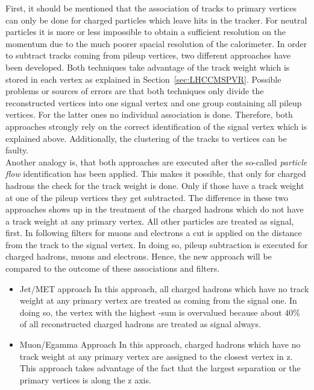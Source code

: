 First, it should be mentioned that the association of tracks to primary vertices can only be done for charged particles which leave hits in the tracker. For neutral particles it is more or less impossible to obtain a sufficient resolution on the momentum due to the much poorer spacial resolution of the calorimeter. In order to subtract tracks coming from pileup vertices, two different approaches have been developed. Both techniques take advantage of the track weight which is stored in each vertex as explained in Section~\ref{sec:LHCCMSPVR}. Possible problems or sources of errors are that both techniques only divide the reconstructed vertices into one signal vertex and one group containing all pileup vertices. For the latter ones no individual association is done. Therefore, both approaches strongly rely on the correct identification of the signal vertex which is explained above. Additionally, the clustering of the tracks to vertices can be faulty. \\
Another analogy is, that both approaches are executed after the so-called \textit{particle flow} identification has been applied. This makes it possible, that only for charged hadrons  the check for the track weight is done.  Only if those have a track weight at one of the pileup vertices they get subtracted. The difference in these two approaches shows up in the treatment of the charged hadrons which do not have a track weight at any primary vertex. All other particles are treated as signal, first. In following filters for muons and electrons a cut is applied on the distance from the track to the signal vertex. In doing so, pileup subtraction is executed for charged hadrons, muons and electrons. Hence, the new approach will be compared to the outcome of these associations and filters.

\begin{itemize}
    \item{Jet/MET approach} In this approach, all charged hadrons which have no track weight at any primary vertex are treated as coming from the signal one. In doing so, the vertex with the highest \pt-sum is overvalued because about $40\%$ of all reconstructed charged hadrons are treated as signal always.

    \item{Muon/Egamma Approach} In this approach, charged hadrons which have no track weight at any primary vertex are assigned to the closest vertex in z. This approach takes advantage of the fact that the largest separation or the primary vertices is along the z axis.
\end{itemize}

